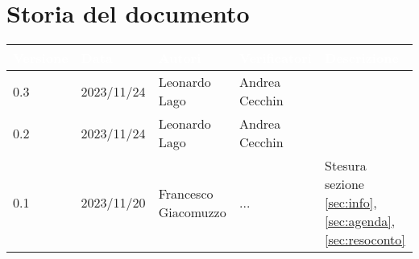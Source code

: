 \section{Storia del documento} \label{sec:storia}
\begingroup
\setlength{\tabcolsep}{10pt}
\renewcommand{\arraystretch}{1.5}
\begin{tabularx}{\textwidth}{| l | l | X | X | X |}
    \hline
    \rowcolor{headerrow} \textbf{\textcolor{white}{Versione}} & \textbf{\textcolor{white}{Data}} & \textbf{\textcolor{white}{Autori}} & \textbf{\textcolor{white}{Verificatori}} & \textbf{\textcolor{white}{Descrizione}} \\
    \hline
    0.3 & 2023/11/24 & Leonardo Lago & Andrea Cecchin & \\
    \hline
    0.2 & 2023/11/24 & Leonardo Lago & Andrea Cecchin & \\
    \hline
    0.1 & 2023/11/20 & Francesco Giacomuzzo & ... & Stesura sezione \ref{sec:info}, \ref{sec:agenda},\ref{sec:resoconto}\\
    \hline
\end{tabularx}
\endgroup